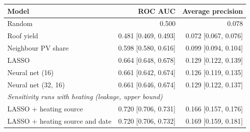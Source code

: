 \begin{tabular}{p{3.4cm}rr}
\toprule
Model & ROC AUC & Average precision \\
\midrule
Random & 0.500 & 0.078 \\
Roof yield & 0.481 [0.469, 0.493] & 0.072 [0.067, 0.076] \\
Neighbour PV share & 0.598 [0.580, 0.616] & 0.099 [0.094, 0.104] \\
LASSO & 0.664 [0.648, 0.678] & 0.129 [0.122, 0.139] \\
Neural net (16) & 0.661 [0.642, 0.674] & 0.126 [0.119, 0.135] \\
Neural net (32, 16) & 0.661 [0.646, 0.674] & 0.129 [0.122, 0.137] \\
\midrule
\multicolumn{3}{l}{\textit{Sensitivity runs with heating (leakage, upper bound)}} \\
LASSO + heating source & 0.720 [0.706, 0.731] & 0.166 [0.157, 0.176] \\
LASSO + heating source and date & 0.720 [0.706, 0.732] & 0.169 [0.159, 0.181] \\
\bottomrule
\end{tabular}
